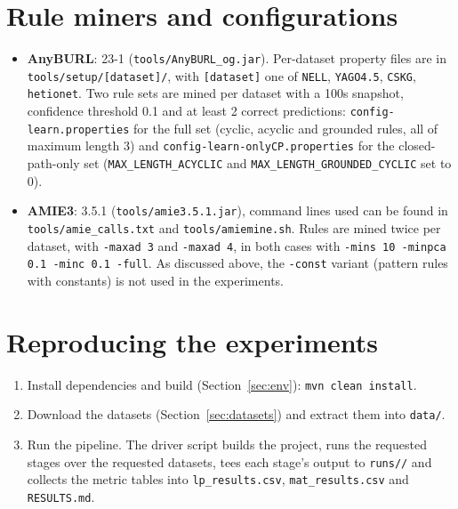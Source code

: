 \documentclass[runningheads]{llncs}
\begin{document}
\section{Rule miners and configurations}
\begin{itemize}
    \item \textbf{AnyBURL}: 23-1 (\texttt{tools/AnyBURL\_og.jar}). Per-dataset property files are in
    \texttt{tools/setup/[dataset]/}, with \texttt{[dataset]} one of \texttt{NELL}, \texttt{YAGO4.5},
    \texttt{CSKG}, \texttt{hetionet}. Two rule sets are mined per dataset with a
    100s snapshot, confidence threshold 0.1 and at least 2 correct predictions:
    \texttt{config-learn.properties} for the full set (cyclic, acyclic and grounded rules, all of
    maximum length 3) and \texttt{config-\allowbreak learn-\allowbreak onlyCP.properties} for the closed-path-only set
    (\texttt{MAX\_\allowbreak LENGTH\_\allowbreak ACYCLIC} and \texttt{MAX\_\allowbreak LENGTH\_\allowbreak GROUNDED\_\allowbreak CYCLIC} set to 0).
    \item \textbf{AMIE3}: 3.5.1 (\texttt{tools/amie3.5.1.jar}), command lines used can be found in
    \texttt{tools/amie\_calls.txt} and \texttt{tools/amiemine.sh}. Rules are mined twice per dataset,
    with \texttt{-maxad 3} and \texttt{-maxad 4}, in both cases with
    \texttt{-mins 10 -minpca 0.1 -minc 0.1 -full}. As discussed above, the \texttt{-const} variant
    (pattern rules with constants) is not used in the experiments.
\end{itemize}

\section{Reproducing the experiments}
\begin{enumerate}
    \item Install dependencies and build (Section~\ref{sec:env}): \texttt{mvn clean install}.
    \item Download the datasets (Section~\ref{sec:datasets}) and extract them into \texttt{data/}.
    \item Run the pipeline. The driver script builds the project, runs the requested stages over the
    requested datasets, tees each stage's output to \texttt{runs/\allowbreak [timestamp]/} and collects the
    metric tables into \texttt{lp\_results.csv}, \texttt{mat\_results.csv} and \texttt{RESULTS.md}.
\end{enumerate}
\end{document}
